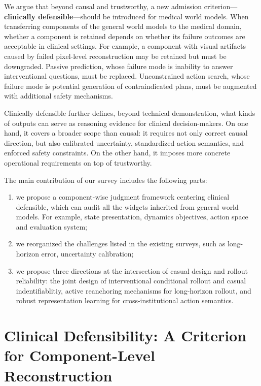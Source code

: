 \documentclass{article}
\begin{document}
We argue that beyond causal and trustworthy, a new admission criterion—\textbf{clinically defensible}—should be introduced for medical world models. When transferring components of the general world models to the medical domain, whether a component is retained depends on whether its failure outcomes are acceptable in clinical settings. For example, a component with visual artifacts caused by failed pixel-level reconstruction may be retained but must be downgraded. Passive prediction, whose failure mode is inability to answer interventional questions, must be replaced. Unconstrained action search, whose failure mode is potential generation of contraindicated plans, must be augmented with additional safety mechanisms.

Clinically defensible further defines, beyond technical demonstration, what kinds of outputs can serve as reasoning evidence for clinical decision-makers. On one hand, it covers a broader scope than causal: it requires not only correct causal direction, but also calibrated uncertainty, standardized action semantics, and enforced safety constraints. On the other hand, it imposes more concrete operational requirements on top of trustworthy.

The main contribution of our survey includes the following parts:

\begin{enumerate}
    \item we propose a component-wise judgment framework centering clinical defensible, which can audit all the widgets inherited from general world models. For example, state presentation, dynamics objectives, action space and evaluation system;
    \item we reorganized the challenges listed in the existing surveys, such as long-horizon error, uncertainty calibration;
    \item we propose three directions at the intersection of casual design and rollout reliability: the joint design of interventional conditional rollout and casual indentifiablitiy, active reanchoring mechanisms for long-horizon rollout, and robust representation learning for cross-institutional action semantics.
\end{enumerate}

\section{Clinical Defensibility: A Criterion for Component-Level Reconstruction}
\end{document}
